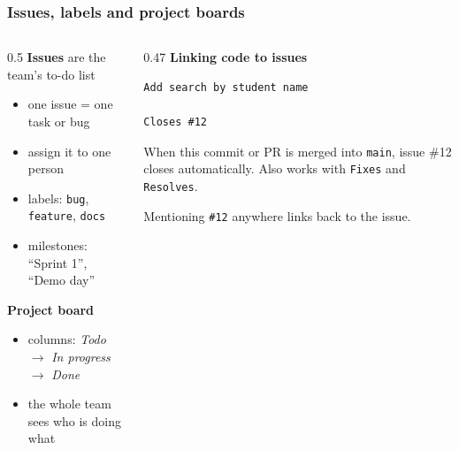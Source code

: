 \documentclass[aspectratio=169,10pt,compress]{beamer}
\begin{document}
\begin{frame}[t,fragile] \frametitle{Issues, labels and project boards}
  \begin{columns}[T]
    \begin{column}{0.5\textwidth}
      \textbf{Issues} are the team's to-do list
      \begin{itemize}\small
        \item one issue = one task or bug
        \item assign it to one person
        \item labels: \texttt{bug}, \texttt{feature}, \texttt{docs}
        \item milestones: ``Sprint 1'', ``Demo day''
      \end{itemize}
      \vspace{0.3em}
      \textbf{Project board}
      \begin{itemize}\small
        \item columns: \emph{Todo} $\rightarrow$ \emph{In progress} $\rightarrow$ \emph{Done}
        \item the whole team sees who is doing what
      \end{itemize}
    \end{column}
    \begin{column}{0.47\textwidth}
      \textbf{Linking code to issues}
\begin{lstlisting}[language={}]
Add search by student name

Closes #12
\end{lstlisting}
      \small
      When this commit or PR is merged into \texttt{main}, issue \#12 closes automatically.
      Also works with \texttt{Fixes} and \texttt{Resolves}.

      \vspace{0.3em}
      Mentioning \texttt{\#12} anywhere links back to the issue.
    \end{column}
  \end{columns}
\end{frame}
\end{document}
